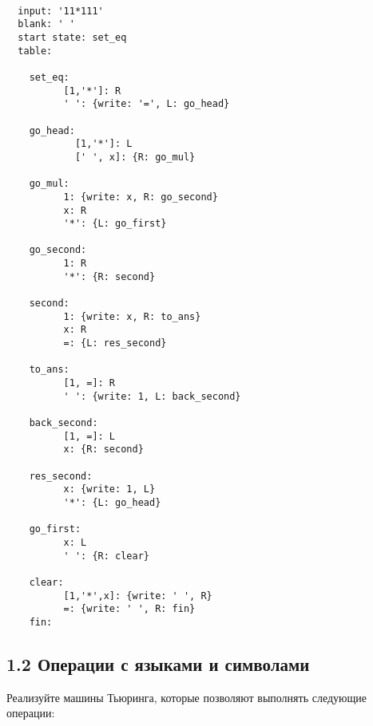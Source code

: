 \documentclass{article}
\begin{document}
\begin{enumerate}
\begin{enumerate}
        \end{enumerate}

        \begin{verbatim}
  
  input: '11*111'
  blank: ' '
  start state: set_eq
  table:

    set_eq:
          [1,'*']: R
          ' ': {write: '=', L: go_head}
    
    go_head:
            [1,'*']: L
            [' ', x]: {R: go_mul}
    
    go_mul:
          1: {write: x, R: go_second}
          x: R
          '*': {L: go_first}
    
    go_second:
          1: R
          '*': {R: second}
    
    second:
          1: {write: x, R: to_ans}
          x: R
          =: {L: res_second}
    
    to_ans:
          [1, =]: R
          ' ': {write: 1, L: back_second}
    
    back_second:
          [1, =]: L
          x: {R: second}
          
    res_second:
          x: {write: 1, L}
          '*': {L: go_head}
    
    go_first:
          x: L
          ' ': {R: clear}
    
    clear:
          [1,'*',x]: {write: ' ', R}
          =: {write: ' ', R: fin}
    fin:
        \end{verbatim}

    
\end{enumerate}


\subsection*{1.2 Операции с языками и символами}
Реализуйте машины Тьюринга, которые позволяют выполнять следующие операции:
\end{document}
